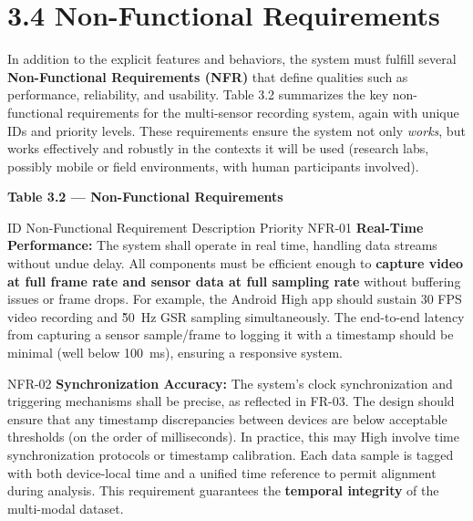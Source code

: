 \documentclass[11pt,a4paper]{report}
\begin{document}
\section{3.4 Non-Functional Requirements}

In addition to the explicit features and behaviors, the system must
fulfill several \textbf{Non-Functional Requirements (NFR)} that define
qualities such as performance, reliability, and usability. Table 3.2
summarizes the key non-functional requirements for the multi-sensor
recording system, again with unique IDs and priority levels. These
requirements ensure the system not only \textit{works}, but works effectively
and robustly in the contexts it will be used (research labs, possibly
mobile or field environments, with human participants involved).

\textbf{Table 3.2 --- Non-Functional Requirements}

  ID                      Non-Functional Requirement Description                                                                                                                                                                                                                                                                Priority
  NFR-01                  \textbf{Real-Time Performance:} The system shall operate in real time, handling data streams without undue delay. All components must be efficient enough to \textbf{capture video at full frame rate and sensor data at full sampling rate} without buffering issues or frame drops. For example, the Android  High
                          app should sustain 30 FPS video recording and \~50 Hz GSR sampling simultaneously. The end-to-end latency from capturing a sensor sample/frame to logging it with a timestamp should be minimal (well below 100 ms), ensuring a responsive system.                                                    

  NFR-02                  \textbf{Synchronization Accuracy:} The system's clock synchronization and triggering mechanisms shall be precise, as reflected in FR-03. The design should ensure that any timestamp discrepancies between devices are below acceptable thresholds (on the order of milliseconds). In practice, this may   High
                          involve time synchronization protocols or timestamp calibration. Each data sample is tagged with both device-local time and a unified time reference to permit alignment during                                                                                                                       
                          analysis\cite{CortisolStressIndicator2020}. This requirement guarantees the \textbf{temporal integrity} of the multi-modal dataset.                                                                       
\end{document}
